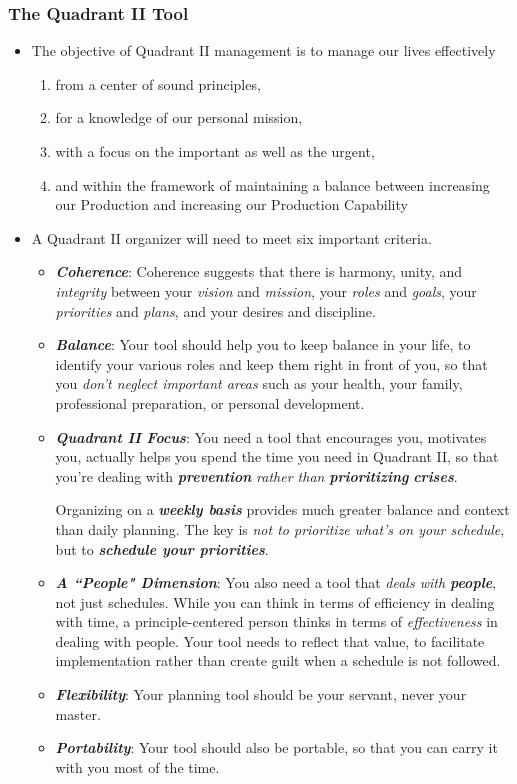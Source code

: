 \documentclass[11pt]{article}
\begin{document}
\subsubsection{The Quadrant II Tool}
\begin{itemize}
\item The objective of Quadrant II management is to manage our lives effectively 
\begin{enumerate}
\item from a center of sound principles, 
\item for a knowledge of our personal mission, 
\item with a focus on the important as well as the urgent,
\item and within the framework of maintaining a balance between increasing our Production and increasing our Production Capability
\end{enumerate}

\item A Quadrant II organizer will need to meet six important criteria.
\begin{itemize}
\item \emph{\textbf{Coherence}}: Coherence suggests that there is harmony, unity, and \emph{integrity} between your \emph{vision} and \emph{mission}, your \emph{roles} and \emph{goals}, your \emph{priorities} and \emph{plans}, and your desires and discipline.
\item \emph{\textbf{Balance}}: Your tool should help you to keep balance in your life, to identify your various roles and keep them right in front of you, so that you \emph{don't neglect important areas} such as your health, your family, professional preparation, or personal development.
\item \emph{\textbf{Quadrant II Focus}}: You need a tool that encourages you, motivates you, actually helps you spend the time you need in Quadrant II, so that you're dealing with \emph{\textbf{prevention}} \emph{rather than} \emph{\textbf{prioritizing}} \emph{\textbf{crises}}.

Organizing on a \emph{\textbf{weekly basis}} provides much greater balance and context than daily planning. The key is \emph{not to prioritize what's on your schedule}, but to \emph{\textbf{schedule your priorities}}. 

\item \emph{\textbf{A ``People" Dimension}}: You also need a tool that \emph{deals with \textbf{people}}, not just schedules. While you can think in terms of efficiency in dealing with time, a principle-centered person thinks in terms of \emph{effectiveness} in dealing with people. Your tool needs to reflect that value, to facilitate implementation rather than create guilt when a schedule is not followed.
\item \emph{\textbf{Flexibility}}: Your planning tool should be your servant, never your master. 
\item \emph{\textbf{Portability}}: Your tool should also be portable, so that you can carry it with you most of the time.
\end{itemize}

\end{itemize}
\end{document}
